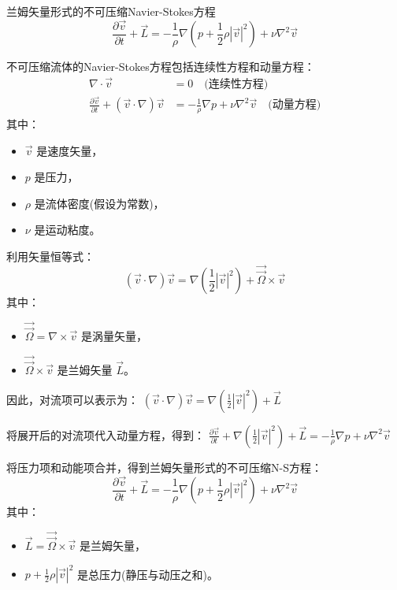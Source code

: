 \begin{lemma}
    兰姆矢量形式的不可压缩Navier-Stokes方程
\[
    \frac{\partial \vec{v}}{\partial t} + \vec{L} = -\frac{1}{\rho} \nabla \left( p + \frac{1}{2} \rho |\vec{v}|^2 \right) + \nu \nabla^2 \vec{v}
    \]
\begin{tui}
    不可压缩流体的Navier-Stokes方程包括连续性方程和动量方程：
    \begin{align*}
        \nabla \cdot \vec{v} &= 0 \quad \text{(连续性方程)}\\
        \frac{\partial \vec{v}}{\partial t} + (\vec{v} \cdot \nabla) \vec{v} &= -\frac{1}{\rho} \nabla p + \nu \nabla^2 \vec{v} \quad \text{(动量方程)} 
    \end{align*}
    其中：
    \begin{itemize}
        \item $\vec{v}$ 是速度矢量，
        \item $p$ 是压力，
        \item $\rho$ 是流体密度(假设为常数)，
        \item $\nu$ 是运动粘度。
    \end{itemize}
    
    利用矢量恒等式：
    \[
    (\vec{v} \cdot \nabla) \vec{v} = \nabla \left( \frac{1}{2} |\vec{v}|^2 \right) + \vec{\vec{\Omega}} \times \vec{v}
    \]
    其中：
    \begin{itemize}
        \item $\vec{\vec{\Omega}} = \nabla \times \vec{v}$ 是涡量矢量，
        \item $\vec{\vec{\Omega}} \times \vec{v}$ 是兰姆矢量 $\vec{L}$。
    \end{itemize}
    
    因此，对流项可以表示为：
    $
    (\vec{v} \cdot \nabla) \vec{v} = \nabla \left( \frac{1}{2} |\vec{v}|^2 \right) + \vec{L}
    $
    
    将展开后的对流项代入动量方程，得到：
    $
    \frac{\partial \vec{v}}{\partial t} + \nabla \left( \frac{1}{2} |\vec{v}|^2 \right) + \vec{L} = -\frac{1}{\rho} \nabla p + \nu \nabla^2 \vec{v}
    $
    
    将压力项和动能项合并，得到兰姆矢量形式的不可压缩N-S方程：
    \[
    \frac{\partial \vec{v}}{\partial t} + \vec{L} = -\frac{1}{\rho} \nabla \left( p + \frac{1}{2} \rho |\vec{v}|^2 \right) + \nu \nabla^2 \vec{v}
    \]
    其中：
    \begin{itemize}
        \item $\vec{L} = \vec{\vec{\Omega}} \times \vec{v}$ 是兰姆矢量，
        \item $p + \frac{1}{2} \rho |\vec{v}|^2$ 是总压力(静压与动压之和)。
    \end{itemize}
\end{tui}
\end{lemma}
